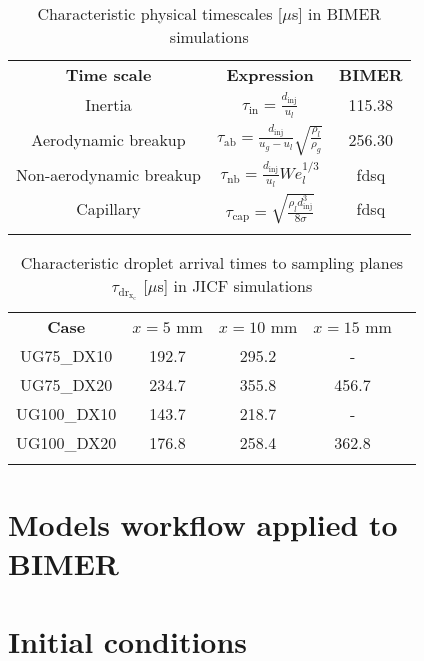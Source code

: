 \begin{table}[!h]
\centering
\caption{Characteristic physical timescales [$\mu$s] in BIMER simulations}
\begin{tabular}{ccc}
\thickhline
\textbf{Time scale} & \textbf{Expression} & \textbf{BIMER}\\
\thickhline
Inertia & $\tau_\mathrm{in} = \frac{d_\mathrm{inj}}{u_l}$ & 115.38 \\
Aerodynamic breakup  &  $\tau_\mathrm{ab} =  \frac{d_\mathrm{inj}}{u_g - u_l} \sqrt{\frac{\rho_l}{\rho_g}} $ & 256.30 \\
Non-aerodynamic breakup  &  $\tau_\mathrm{nb} = \frac{d_\mathrm{inj}}{u_l} We_l^{1/3} $ &  fdsq \\
Capillary & $\tau_\mathrm{cap} = \sqrt{\frac{\rho_l d_\mathrm{inj}^3}{8 \sigma}}$ & fdsq \\
\thickhline
\end{tabular}
\label{tab:BIMER_SPS_characteristic times}
\end{table} 




\begin{table}[!h]
\centering
\caption{Characteristic droplet arrival times to sampling planes $\tau_\mathrm{dr_{x_c}}$ [$\mu$s] in JICF simulations}
\begin{tabular}{ccccc}
\thickhline
\textbf{Case} & $x = 5$ mm & $x = 10$ mm & $x = 15$ mm  \\
\thickhline 
UG75\_DX10  & 192.7 & 295.2 & -  \\
UG75\_DX20  & 234.7 & 355.8 & 456.7 \\
UG100\_DX10 & 143.7 & 218.7 & - \\
UG100\_DX20 & 176.8 & 258.4 & 362.8 \\
\thickhline
\end{tabular}
\label{tab:BIMER_SPS_characteristic_droplet_sampling_times}
\end{table}




\clearpage

\section{Models workflow applied to BIMER}



\section{Initial conditions}

